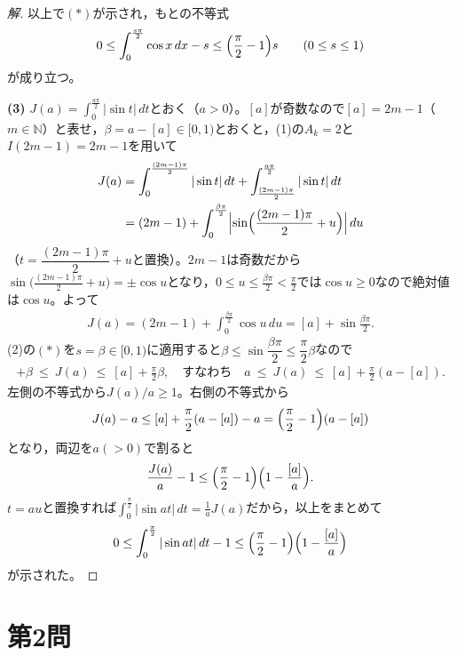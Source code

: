 \documentclass[../main.tex]{subfiles}
\begin{document}
\begin{proof}[解]
  以上で$(\ast)$が示され，もとの不等式
  \begin{align*}
    0\le\int_0^{\frac{s\pi}2}\cos x\,dx-s\le\Bigl(\frac\pi2-1\Bigr)s\qquad(0\le s\le1)
  \end{align*}
  が成り立つ。

  \textbf{(3)} $J(a)=\displaystyle\int_0^{\frac{a\pi}2}|\sin t|\,dt$とおく（$a>0$）。$[a]$が奇数なので$[a]=2m-1$（$m\in\mathbb N$）と表せ，$\beta=a-[a]\in[0,1)$とおくと，(1)の$A_k=2$と$I(2m-1)=2m-1$を用いて
  \begin{align*}
    J(a)&=\int_0^{\frac{(2m-1)\pi}2}|\sin t|\,dt+\int_{\frac{(2m-1)\pi}2}^{\frac{a\pi}2}|\sin t|\,dt\\
    &=(2m-1)+\int_0^{\frac{\beta\pi}2}\Bigl|\sin\Bigl(\frac{(2m-1)\pi}2+u\Bigr)\Bigr|\,du
  \end{align*}
  （$t=\dfrac{(2m-1)\pi}2+u$と置換）。$2m-1$は奇数だから$\sin\bigl(\frac{(2m-1)\pi}2+u\bigr)=\pm\cos u$となり，$0\le u\le\frac{\beta\pi}2<\frac\pi2$では$\cos u\ge0$なので絶対値は$\cos u$。よって
  \begin{align*}
    J(a)=(2m-1)+\int_0^{\frac{\beta\pi}2}\cos u\,du=[a]+\sin\frac{\beta\pi}2.
  \end{align*}
  (2)の$(\ast)$を$s=\beta\in[0,1)$に適用すると$\beta\le\sin\dfrac{\beta\pi}2\le\dfrac\pi2\beta$なので
  \begin{align*}
    [a]+\beta\ \le\ J(a)\ \le\ [a]+\frac\pi2\beta,
    \quad\text{すなわち}\quad
    a\ \le\ J(a)\ \le\ [a]+\frac\pi2(a-[a]).
  \end{align*}
  左側の不等式から$J(a)/a\ge1$。右側の不等式から
  \begin{align*}
    J(a)-a\le[a]+\frac\pi2(a-[a])-a=\Bigl(\frac\pi2-1\Bigr)(a-[a])
  \end{align*}
  となり，両辺を$a(>0)$で割ると
  \begin{align*}
    \frac{J(a)}a-1\le\Bigl(\frac\pi2-1\Bigr)\Bigl(1-\frac{[a]}a\Bigr).
  \end{align*}
  $t=au$と置換すれば$\displaystyle\int_0^{\frac\pi2}|\sin at|\,dt=\frac1aJ(a)$だから，以上をまとめて
  \begin{align*}
    0\le\int_0^{\frac\pi2}|\sin at|\,dt-1\le\Bigl(\frac\pi2-1\Bigr)\Bigl(1-\frac{[a]}a\Bigr)
  \end{align*}
  が示された。
\end{proof}

\newpage

\section*{第2問}
\end{document}
